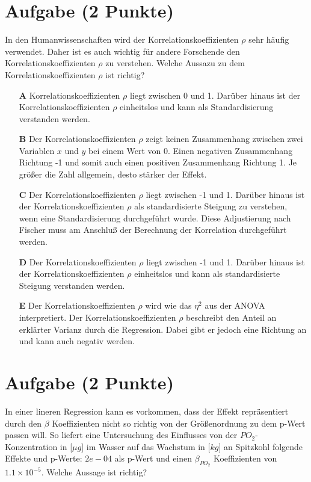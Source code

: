 \documentclass[a4paper, 9pt]{scrartcl}\usepackage[]{graphicx}\usepackage[]{xcolor}
\begin{document}
\section{Aufgabe \hfill (2 Punkte)}




In den Humanwissenschaften wird der Korrelationskoeffizienten $\rho$ sehr häufig verwendet. Daher ist es auch wichtig für andere Forschende den Korrelationskoeffizienten $\rho$ zu verstehen. Welche Aussazu zu dem Korrelationskoeffizienten $\rho$ ist richtig?




\begin{enumerate}
\item [\textbf{A} \msquare] Korrelationskoeffizienten $\rho$ liegt zwischen 0 und 1. Darüber hinaus ist der Korrelationskoeffizienten $\rho$ einheitslos und kann als Standardisierung verstanden werden.
\item [\textbf{B} \msquare] Der Korrelationskoeffizienten $\rho$ zeigt keinen Zusammenhang zwischen zwei Variablen $x$ und $y$ bei einem Wert von 0. Einen negativen Zusammenhang Richtung -1 und somit auch einen positiven Zusammenhang Richtung 1. Je größer die Zahl allgemein, desto stärker der Effekt.
\item [\textbf{C} \msquare] Der Korrelationskoeffizienten $\rho$ liegt zwischen -1 und 1. Darüber hinaus ist der Korrelationskoeffizienten $\rho$ als standardisierte Steigung zu verstehen, wenn eine Standardisierung durchgeführt wurde. Diese Adjustierung nach Fischer muss am Anschluß der Berechnung der Korrelation durchgeführt werden.
\item [\textbf{D} \msquare] Der Korrelationskoeffizienten $\rho$ liegt zwischen -1 und 1. Darüber hinaus ist der Korrelationskoeffizienten $\rho$ einheitslos und kann als standardisierte Steigung verstanden werden.
\item [\textbf{E} \msquare] Der Korrelationskoeffizienten $\rho$ wird wie das $\eta^2$ aus der ANOVA interpretiert. Der Korrelationskoeffizienten $\rho$ beschreibt den Anteil an erklärter Varianz durch die Regression. Dabei gibt er jedoch eine Richtung an und kann auch negativ werden.
\end{enumerate}

\section{Aufgabe \hfill (2 Punkte)}



In einer lineren Regression kann es vorkommen, dass der Effekt repräsentiert durch den $\beta$ Koeffizienten nicht so richtig von der Größenordnung zu dem p-Wert passen will. So liefert eine Untersuchung des Einflusses von der $PO_2$-Konzentration in [$\mu g$] im Wasser auf das Wachstum in [$kg$] an Spitzkohl folgende Effekte und p-Werte: $2e-04$ als p-Wert und einen $\beta_{PO_2}$ Koeffizienten von $1.1\times 10^{-5}$. Welche Aussage ist richtig?
\end{document}
